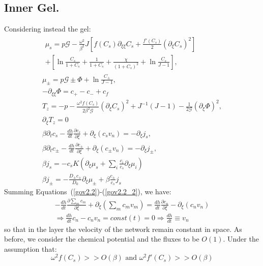 \documentclass[12pt]{extarticle}
\begin{document}
\subsection{Inner Gel.}
Considering instead the gel:
\begin{gather}
\begin{aligned}
\mu_s = p \mathcal{G} - \frac{\omega^2}{\beta^2} J \left[f(C_s)\partial_{\xi\xi} C_s+\frac{f'(C_s)}{2}\left(\partial_\xi C_s\right)^2\right]\\
+ \left[\ln \frac{C_s}{1+C_s} + \frac{1}{1+C_s}+\frac{\chi}{(1+C_s)^2} + \ln \frac{C_s}{J-1} \right], 
\end{aligned}\label{mus2.2}\\[2.5mm]
\mu_\pm = p \mathcal{G} \pm \Phi  + \ln \frac{C_\pm}{J-1} ,\\
-\partial_{\xi\xi} \Phi = c_+-c_-+c_f\,\label{Poi2.2} \\
T_z= -p-\frac{\omega^2 f(C_s)}{2\beta^2\mathcal{G}} (\partial_\xi C_s)^2+ J^{-1}\left(J-1\right)-\frac{1}{2\mathcal{G}} (\partial_\xi \Phi)^2,\label{T2.2}\\
\partial_\xi T_z=0\\
\beta \partial_t c_s -\frac{dh}{dt}\frac{\partial c_s}{\partial \xi}+\partial_\xi (c_s v_n)= - \partial_\xi j_s,\label{gov2.2}\\
\beta \partial_t c_\pm -\frac{dh}{dt}\frac{\partial c_\pm}{\partial \xi}+\partial_\xi (c_\pm v_n)= -\partial_\xi j_\pm,\label{gov2.2_2}\\
\beta j_s =-c_s K  \left(\partial_\xi\mu_s +\sum_i \frac{c_i}{c_s} \partial_\xi \mu_i\right)\\
\beta j_\pm= - \frac{D_\pm c_\pm}{D_0}\partial_\xi \mu_\pm + \beta \frac{c_\pm}{c_s}j_s
\end{gather}
Summing Equations~(\ref{gov2.2})-(\ref{gov2.2_2}), we have:
\begin{equation}
\begin{aligned}
-\frac{dh}{dt}\frac{\partial \sum_m c_m}{\partial \xi}+ \partial_\xi \left(\sum_m c_m v_m\right)= \frac{dh}{dt}\frac{\partial c_n}{\partial \xi}-\partial_\xi (c_n v_n)\\
\Rightarrow  \frac{dh}{dt} c_n -c_n v_n=const(t)=0 \Rightarrow  \frac{dh}{dt} \equiv v_n
\end{aligned}
\end{equation}
so that in the layer the velocity of the network remain constant in space.
As before, we consider the chemical potential and the fluxes to be $O(1)$. Under the assumption that:
\begin{equation}
\omega^2 f(C_s)>> O(\beta) \text{ and } \omega^2 f'(C_s)>> O(\beta)
\end{equation}
\end{document}

